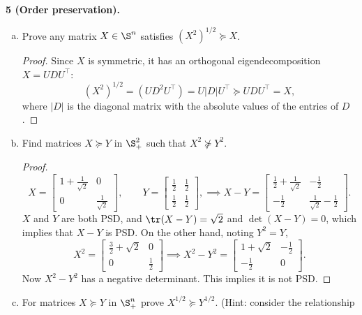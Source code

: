 \documentclass[../borwein-lewis_notes.tex]{subfiles}
\begin{document}
\noindent\textbf{5 (Order preservation).}
\begin{enumerate}[(a)]
\item Prove any matrix $X\in\S^n$ satisfies $(X^2)^{1/2}\succeq X$.
\begin{proof}
Since $X$ is symmetric, it has an orthogonal eigendecomposition
$X=UDU^\top$:
\begin{equation*}
(X^2)^{1/2} = (UD^2U^\top) = U|D|U^\top \succeq UDU^\top=X,
\end{equation*}
where $|D|$ is the diagonal matrix with the absolute values of 
the entries of $D$.
\end{proof}
\item Find matrices $X\succeq Y$ in $\S_+^2$ such that $X^2\not\succeq
Y^2$.
\begin{proof}
\begin{equation*}
X = \begin{bmatrix}
1+\frac{1}{\sqrt{2}} & 0 \\
0 & \frac{1}{\sqrt{2}}
\end{bmatrix},
\qquad 
Y= \begin{bmatrix}
\frac{1}{2} & \frac{1}{2}\\
\frac{1}{2} & \frac{1}{2}
\end{bmatrix},
\implies 
X-Y = \begin{bmatrix} \frac{1}{2}+\frac{1}{\sqrt{2}} & -\frac{1}{2}\\
-\frac{1}{2} & \frac{1}{\sqrt{2}} - \frac{1}{2}
\end{bmatrix}.
\end{equation*}
$X$ and $Y$ are both PSD, and $\tr(X-Y)=\sqrt{2}$ and $\det(X-Y)
=0$, which implies that $X-Y$ is PSD. On the other hand, noting 
$Y^2=Y$, 
\begin{equation*}
X^2 = \begin{bmatrix}
\frac{3}{2}+\sqrt{2} & 0 \\
0 & \frac{1}{2}
\end{bmatrix}
\implies X^2 - Y^2 = \begin{bmatrix} 1 + \sqrt{2} & -\frac{1}{2} \\
-\frac{1}{2} & 0 \end{bmatrix}.
\end{equation*}
Now $X^2 - Y^2$ has a negative determinant. This implies it is not 
PSD.
\end{proof}
\item For matrices $X\succeq Y$ in $\S_+^n$ prove $X^{1/2}\succeq Y^{1/2}$.
(Hint: consider the relationship 
\begin{equation*}

\end{equation*}
\end{enumerate}
\end{document}
